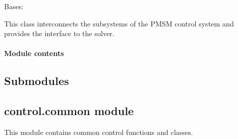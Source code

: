 \documentclass[letterpaper,10pt,english]{sphinxmanual}
\begin{document}

\begin{fulllineitems}
\label{\detokenize{control.sm:control.sm.vector.VectorCtrl}}
\pysigstartsignatures
{}
\pysigstopsignatures
\sphinxAtStartPar
Bases: 

\sphinxAtStartPar
This class interconnects the subsystems of the PMSM control system and
provides the interface to the solver.

\end{fulllineitems}



\paragraph{Module contents}
\label{\detokenize{control.sm:module-control.sm}}\label{\detokenize{control.sm:module-contents}}

\subsection{Submodules}
\label{\detokenize{control:submodules}}

\subsection{control.common module}
\label{\detokenize{control:module-control.common}}\label{\detokenize{control:control-common-module}}
\sphinxAtStartPar
This module contains common control functions and classes.
\end{document}
